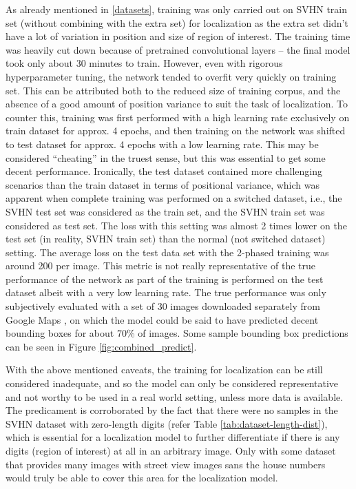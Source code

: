 \documentclass{article}
\begin{document}
	As already mentioned in \ref{datasets}, training was only carried out on SVHN train set (without combining with the extra set) for localization as the extra set didn't have a lot of variation in position and size of region of interest. The training time was heavily cut down because of pretrained convolutional layers -- the final model took only about 30 minutes to train. However, even with rigorous hyperparameter tuning, the network tended to overfit very quickly on training set. This can be attributed both to the reduced size of training corpus, and the absence of a good amount of position variance to suit the task of localization. To counter this, training was first performed with a high learning rate exclusively on train dataset for approx. 4 epochs, and then training on the network was shifted to test dataset for approx. 4 epochs with a low learning rate. This may be considered ``cheating'' in the truest sense, but this was essential to get some decent performance. Ironically, the test dataset contained more challenging scenarios than the train dataset in terms of positional variance, which was apparent when complete training was performed on a switched dataset, i.e., the SVHN test set was considered as the train set, and the SVHN train set was considered as test set. The loss with this setting was almost 2 times lower on the test set (in reality, SVHN train set) than the normal (not switched dataset) setting. The average loss on the test data set with the 2-phased training was around 200 per image. This metric is not really representative of the true performance of the network as part of the training is performed on the test dataset albeit with a very low learning rate. The true performance was only subjectively evaluated with a set of 30 images downloaded separately from Google Maps \cite{google-street-view-samples}, on which the model could be said to have predicted decent bounding boxes for about 70\% of images. Some sample bounding box predictions can be seen in Figure \ref{fig:combined_predict}.
	
	With the above mentioned caveats, the training for localization can be still considered inadequate, and so the model can only be considered representative and not worthy to be used in a real world setting, unless more data is available. The predicament is corroborated by the fact that there were no samples in the SVHN dataset with zero-length digits (refer Table \ref{tab:dataset-length-dist}), which is essential for a localization model to further differentiate if there is any digits (region of interest) at all in an arbitrary image. Only with some dataset that provides many images with street view images sans the house numbers would truly be able to cover this area for the localization model. 
	
\end{document}
